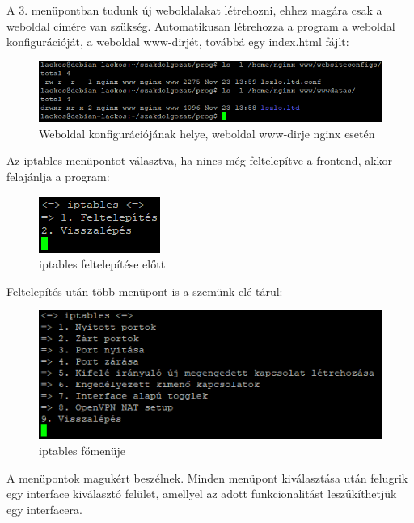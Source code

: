 A 3. menüpontban tudunk új weboldalakat létrehozni, ehhez magára csak a weboldal címére van szükség. Automatikusan létrehozza a program a weboldal konfigurációját, a weboldal www-dirjét, továbbá egy index.html fájlt:

\begin{figure}[h]
\centering
\includegraphics[scale=1]{images/website_config_dir_examples.png}
\caption{Weboldal konfigurációjának helye, weboldal www-dirje nginx esetén}
\end{figure}

\pagebreak


Az iptables menüpontot választva, ha nincs még feltelepítve a frontend, akkor felajánlja a program:

\begin{figure}[h]
\centering
\includegraphics[scale=1]{images/iptables_before_install.png}
\caption{iptables feltelepítése előtt}
\end{figure}


Feltelepítés után több menüpont is a szemünk elé tárul:

\begin{figure}[h]
\centering
\includegraphics[scale=1]{images/iptables_mainmenu.png}
\caption{iptables főmenüje}
\end{figure}

A menüpontok magukért beszélnek. Minden menüpont kiválasztása után felugrik egy interface kiválasztó felület, amellyel az adott funkcionalitást leszűkíthetjük egy interfacera.

